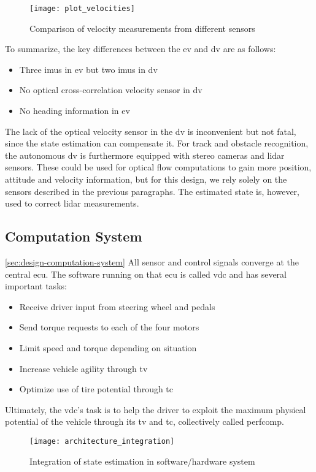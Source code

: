 \begin{figure}
	\centering
	\texttt{[image: plot\_velocities]}%
	\caption{Comparison of velocity measurements from different sensors}
	\label{fig:velocities}
\end{figure}

To summarize, the key differences between the \gls{ev} and \gls{dv} are as follows:
\begin{itemize}
\item Three \glspl{imu} in \gls{ev} but two \glspl{imu} in \gls{dv}
\item No optical cross-correlation velocity sensor in \gls{dv}
\item No heading information in \gls{ev}
\end{itemize}
The lack of the optical velocity sensor in the \gls{dv} is inconvenient but not fatal, since the state estimation can compensate it. For track and obstacle recognition, the autonomous \gls{dv} is furthermore equipped with stereo cameras and lidar sensors. These could be used for optical flow computations to gain more position, attitude and velocity information, but for this design, we rely solely on the sensors described in the previous paragraphs. The estimated state is, however, used to correct lidar measurements.


\subsection{Computation System}\ref{sec:design-computation-system}
All sensor and control signals converge at the central \gls{ecu}. The software running on that \gls{ecu} is called \gls{vdc} and has several important tasks:
\begin{itemize}
\item Receive driver input from steering wheel and pedals
\item Send torque requests to each of the four motors
\item Limit speed and torque depending on situation
\item Increase vehicle agility through \gls{tv}
\item Optimize use of tire potential through \gls{tc}
\end{itemize}
Ultimately, the \gls{vdc}'s task is to help the driver to exploit the maximum physical potential of the vehicle through its \gls{tv} and \gls{tc}, collectively called \gls{perfcomp}.

\begin{figure}
	\centering
	\texttt{[image: architecture\_integration]}%
	\caption{Integration of state estimation in software/hardware system}
	\label{fig:architecture-integration}
\end{figure}


